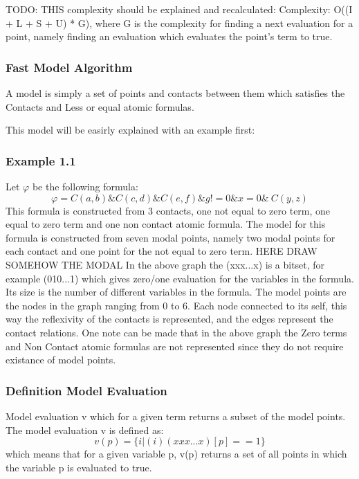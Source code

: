 \documentclass{article}
\begin{document}
			TODO: THIS complexity should be explained and recalculated:
			\newline
			Complexity: O((I + L + S + U) * G), where G is the complexity for finding a next evaluation for a point, 
			namely finding an evaluation which evaluates the point's term to true.
	\newpage
		\subsubsection*{Fast Model Algorithm}
			A model is simply a set of points and contacts between them which satisfies the Contacts and Less or equal atomic formulas.

			This model will be easirly explained with an example first:
			\subsubsection*{Example 1.1}
				Let $\varphi$ be the following formula:
				\begin{equation*}
					\varphi = C(a,b) \& C(c,d) \& C(e,f) \& g != 0 \& x = 0 \& ~C(y,z)
				\end{equation*}
				This formula is constructed from 3 contacts, one not equal to zero term, one equal to zero term 
				and one non contact atomic formula.
				\newline
				The model for this formula is constructed from seven modal points, namely two modal points for each
				contact and one point for the not equal to zero term.
				\newline
				HERE DRAW SOMEHOW THE MODAL
				\newline
				In the above graph the (xxx...x) is a bitset, for example (010...1) which gives zero/one evaluation
				for the variables in the formula. Its size is the number of different variables in the formula.
				The model points are the nodes in the graph ranging from 0 to 6. 
				Each node connected to its self, this way the reflexivity of the contacts is represented, and the 
				edges represent the contact relations.
				\newline
				One note can be made that in the above graph the Zero terms and Non Contact atomic formulas are 
				not represented since they do not require existance of model points.

				\subsubsection*{Definition Model Evaluation}
				Model evaluation v which for a given term returns a subset of the model points.
				The model evaluation v is defined as:
				\begin{equation*}
					v(p) = \{ i | (i) (xxx...x)[p] == 1 \} 
				\end{equation*}
				which means that for a given variable p, 
				v(p) returns a set of all points in which the variable p is evaluated to true.
\end{document}
